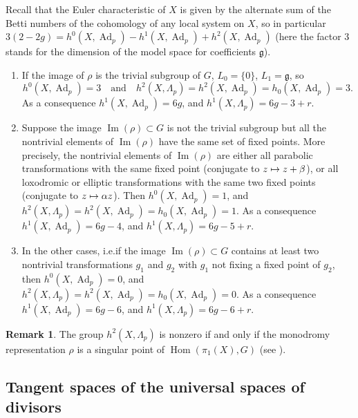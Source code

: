 \documentclass[10pt]{amsart}
\newcommand{\ie}{i.e.}
\newcommand\mto{\mathchoice{\longmapsto}{\mapsto}{\mapsto}{\mapsto}}
\DeclareMathOperator{\Ad}{Ad}
\DeclareMathOperator{\Hom}{Hom}
\DeclareMathOperator{\Image}{Im}
\theoremstyle{definition}
\newtheorem{remark}[definition]{Remark}
\theoremstyle{plain}
\begin{document}
Recall that the Euler characteristic of $X$ is given by the alternate sum of the Betti numbers of the cohomology of any local system on $X$, so in particular $3(2-2g) = h^0\left(X, \Ad_p\right) - h^1\left(X, \Ad_p\right) + h^2\left(X, \Ad_p\right)$ (here the factor $3$ stands for the dimension of the model space for coefficients $\mathfrak g$).
\begin{enumerate}
\item
If the image of $\rho$ is the trivial subgroup of $G$, $L_0 = \{0\}$, $L_1 = \mathfrak g$, so
\[
h^0\left(X, \Ad_p\right) = 3\quad\text{and}\quad h^2\left(X, \Lambda_p\right) = h^2\left(X, \Ad_p\right) = h_0\left(X, \Ad_p\right) = 3.
\]
As a consequence $h^1\left(X, \Ad_p\right) = 6g$, and $h^1\left(X, \Lambda_p\right) = 6g-3+r$.
\item
Suppose the image $\Image(\rho) \subset G$ is not the trivial subgroup but all the nontrivial elements of $\Image(\rho)$ have the same set of fixed points.
More precisely, the nontrivial elements of $\Image(\rho)$ are either all parabolic transformations with the same fixed point (conjugate to $z \mto z + \beta$), or all loxodromic or elliptic transformations with the same two fixed points (conjugate to $z \mto \alpha z$).
Then $h^0\left(X, \Ad_p\right) = 1$, and $h^2\left(X, \Lambda_p\right) = h^2\left(X, \Ad_p\right) = h_0\left(X, \Ad_p\right) = 1$.
As a consequence $h^1\left(X, \Ad_p\right) = 6g-4$, and $h^1\left(X, \Lambda_p\right) = 6g-5+r$.
\item
In the other cases, \ie if the image $\Image(\rho) \subset G$ contains at least two nontrivial transformations $g_1$ and $g_2$ with $g_1$ not fixing a fixed point of $g_2$, then $h^0\left(X, \Ad_p\right) = 0$, and $h^2\left(X, \Lambda_p\right) = h^2\left(X, \Ad_p\right) = h_0\left(X, \Ad_p\right) = 0$.
As a consequence $h^1\left(X, \Ad_p\right) = 6g-6$, and $h^1\left(X, \Lambda_p\right) = 6g-6+r$.
\end{enumerate}

\begin{remark}
The group $h^2\left(X, \Lambda_p\right)$ is nonzero if and only if the monodromy representation $\rho$ is a singular point of $\Hom(\pi_1(X), G)$ (see \cite{hubbard}).
\end{remark}

\subsection{Tangent spaces of the universal spaces of divisors}\label{subsection_tangent_spaces_univ_spaces_div}
\end{document}
